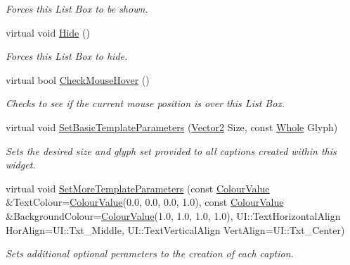 \begin{DoxyCompactItemize}
\begin{DoxyCompactList}\small\item\em Forces this List Box to be shown. \item\end{DoxyCompactList}\item 
\hypertarget{classphys_1_1UI_1_1ListBox_a896220f2423ce6295ea3c8dc3a10d4b8}{
virtual void \hyperlink{classphys_1_1UI_1_1ListBox_a896220f2423ce6295ea3c8dc3a10d4b8}{Hide} ()}
\label{classphys_1_1UI_1_1ListBox_a896220f2423ce6295ea3c8dc3a10d4b8}

\begin{DoxyCompactList}\small\item\em Forces this List Box to hide. \item\end{DoxyCompactList}\item 
virtual bool \hyperlink{classphys_1_1UI_1_1ListBox_a789faeb98d98bb4d4d89cae8c53d4bc0}{CheckMouseHover} ()
\begin{DoxyCompactList}\small\item\em Checks to see if the current mouse position is over this List Box. \item\end{DoxyCompactList}\item 
virtual void \hyperlink{classphys_1_1UI_1_1ListBox_a093415bd4d69dfdb0b1ffa3f868fe4f5}{SetBasicTemplateParameters} (\hyperlink{classphys_1_1Vector2}{Vector2} Size, const \hyperlink{namespacephys_a460f6bc24c8dd347b05e0366ae34f34a}{Whole} Glyph)
\begin{DoxyCompactList}\small\item\em Sets the desired size and glyph set provided to all captions created within this widget. \item\end{DoxyCompactList}\item 
virtual void \hyperlink{classphys_1_1UI_1_1ListBox_a8396c55be0de8fd33d8ce35b83781540}{SetMoreTemplateParameters} (const \hyperlink{classphys_1_1ColourValue}{ColourValue} \&TextColour=\hyperlink{classphys_1_1ColourValue}{ColourValue}(0.0, 0.0, 0.0, 1.0), const \hyperlink{classphys_1_1ColourValue}{ColourValue} \&BackgroundColour=\hyperlink{classphys_1_1ColourValue}{ColourValue}(1.0, 1.0, 1.0, 1.0), UI::TextHorizontalAlign HorAlign=UI::Txt\_\-Middle, UI::TextVerticalAlign VertAlign=UI::Txt\_\-Center)
\begin{DoxyCompactList}\small\item\em Sets additional optional perameters to the creation of each caption. \item\end{DoxyCompactList}\item 

\end{DoxyCompactItemize}
